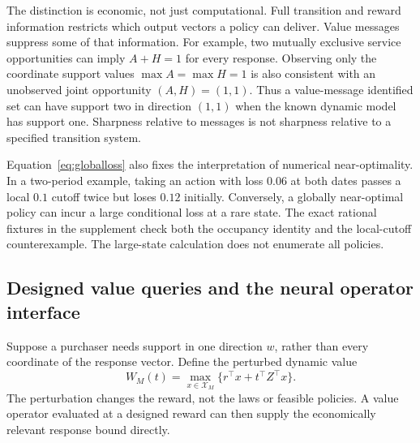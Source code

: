 The distinction is economic, not just computational. Full transition and reward information restricts which output vectors a policy can deliver. Value messages suppress some of that information. For example, two mutually exclusive service opportunities can imply $A+H=1$ for every response. Observing only the coordinate support values $\max A=\max H=1$ is also consistent with an unobserved joint opportunity $(A,H)=(1,1)$. Thus a value-message identified set can have support two in direction $(1,1)$ when the known dynamic model has support one. Sharpness relative to messages is not sharpness relative to a specified transition system.

Equation~\eqref{eq:globalloss} also fixes the interpretation of numerical near-optimality. In a two-period example, taking an action with loss $0.06$ at both dates passes a local $0.1$ cutoff twice but loses $0.12$ initially. Conversely, a globally near-optimal policy can incur a large conditional loss at a rare state. The exact rational fixtures in the supplement check both the occupancy identity and the local-cutoff counterexample. The large-state calculation does not enumerate all policies.

\subsection{Designed value queries and the neural operator interface}
\label{sec:directedqueries}
Suppose a purchaser needs support in one direction $w$, rather than every coordinate of the response vector. Define the perturbed dynamic value
\[
 W_M(t)=\max_{x\in\mathcal X_M}\{r^\top x+t^\top Z^\top x\}.
\]
The perturbation changes the reward, not the laws or feasible policies. A value operator evaluated at a designed reward can then supply the economically relevant response bound directly.

